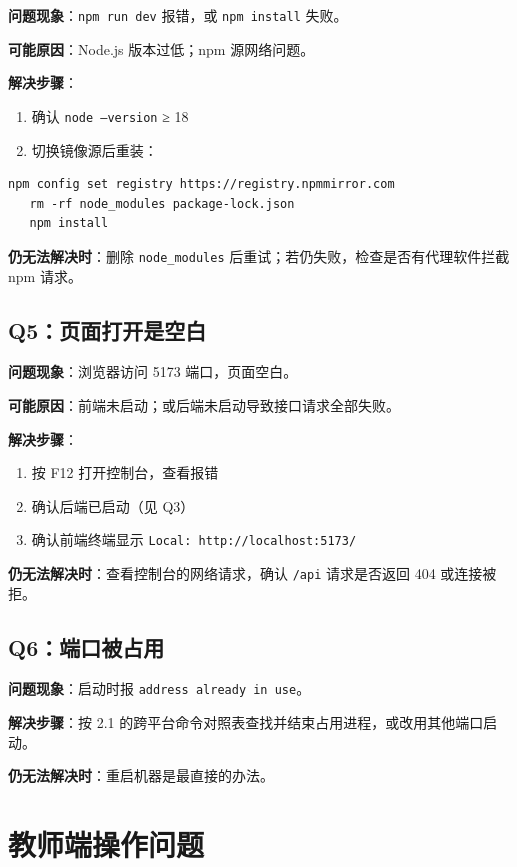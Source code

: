 \documentclass[UTF8,a4paper,11pt]{ctexrep}
\begin{document}
\textbf{问题现象}：\texttt{npm run dev} 报错，或 \texttt{npm install} 失败。

\textbf{可能原因}：Node.js 版本过低；npm 源网络问题。

\textbf{解决步骤}：

\begin{enumerate}
\item 确认 \texttt{node --version} ≥ 18
\item 切换镜像源后重装：
\end{enumerate}
\begin{Verbatim}[breaklines=true,breakanywhere=true,fontsize=\small,frame=single,framesep=4pt,rulecolor=\color{codeframe}]
   npm config set registry https://registry.npmmirror.com
   rm -rf node_modules package-lock.json
   npm install
\end{Verbatim}

\textbf{仍无法解决时}：删除 \texttt{node\_modules} 后重试；若仍失败，检查是否有代理软件拦截 npm 请求。


\subsection{Q5：页面打开是空白}

\textbf{问题现象}：浏览器访问 5173 端口，页面空白。

\textbf{可能原因}：前端未启动；或后端未启动导致接口请求全部失败。

\textbf{解决步骤}：

\begin{enumerate}
\item 按 F12 打开控制台，查看报错
\item 确认后端已启动（见 Q3）
\item 确认前端终端显示 \texttt{Local: http://localhost:5173/}
\end{enumerate}
\textbf{仍无法解决时}：查看控制台的网络请求，确认 \texttt{/api} 请求是否返回 404 或连接被拒。


\subsection{Q6：端口被占用}

\textbf{问题现象}：启动时报 \texttt{address already in use}。

\textbf{解决步骤}：按 2.1 的跨平台命令对照表查找并结束占用进程，或改用其他端口启动。

\textbf{仍无法解决时}：重启机器是最直接的办法。


\section{教师端操作问题}
\end{document}
